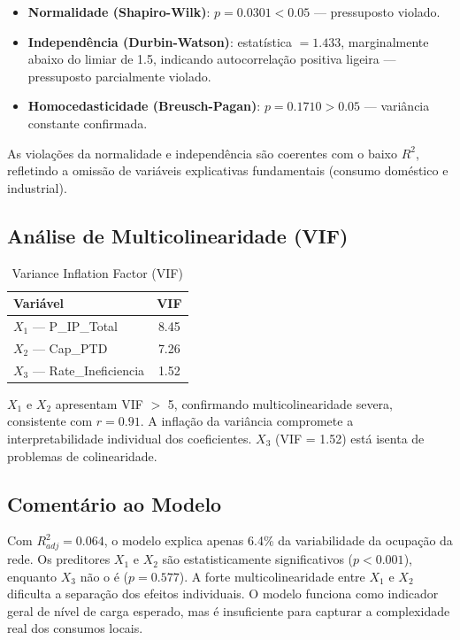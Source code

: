 \documentclass[conference]{IEEEtran}
\begin{document}
\begin{itemize}
    \item \textbf{Normalidade (Shapiro-Wilk)}: $p = 0.0301 < 0.05$ --- pressuposto violado.
    \item \textbf{Independência (Durbin-Watson)}: estatística $= 1.433$, marginalmente abaixo do limiar de 1.5, indicando autocorrelação positiva ligeira --- pressuposto parcialmente violado.
    \item \textbf{Homocedasticidade (Breusch-Pagan)}: $p = 0.1710 > 0.05$ --- variância constante confirmada.
\end{itemize}

As violações da normalidade e independência são coerentes com o baixo $R^2$, refletindo a omissão de variáveis explicativas fundamentais (consumo doméstico e industrial).

\subsection{Análise de Multicolinearidade (VIF)}

\begin{table}[htbp]
\caption{Variance Inflation Factor (VIF)}
\label{tab:vif}
\centering
\begin{tabular}{lc}
\hline
\textbf{Variável}               & \textbf{VIF} \\
\hline
$X_1$ --- P\_IP\_Total          & 8.45 \\
$X_2$ --- Cap\_PTD              & 7.26 \\
$X_3$ --- Rate\_Ineficiencia    & 1.52 \\
\hline
\end{tabular}
\end{table}

$X_1$ e $X_2$ apresentam VIF $>$ 5, confirmando multicolinearidade severa, consistente com $r = 0.91$. A inflação da variância compromete a interpretabilidade individual dos coeficientes. $X_3$ (VIF = 1.52) está isenta de problemas de colinearidade.

\subsection{Comentário ao Modelo}

Com $R^2_{adj} = 0.064$, o modelo explica apenas 6.4\% da variabilidade da ocupação da rede. Os preditores $X_1$ e $X_2$ são estatisticamente significativos ($p < 0.001$), enquanto $X_3$ não o é ($p = 0.577$). A forte multicolinearidade entre $X_1$ e $X_2$ dificulta a separação dos efeitos individuais. O modelo funciona como indicador geral de nível de carga esperado, mas é insuficiente para capturar a complexidade real dos consumos locais.
\end{document}
